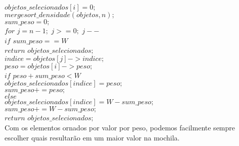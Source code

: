 \documentclass[10pt,a4paper]{article}
\begin{document}
	\hspace{2cm}$objetos\_selecionados[i] = 0;$\\

	\hspace{1cm}$mergesort\_densidade(objetos,n);$\\

	\hspace{1cm}$sum\_peso=0;$\\

	\hspace{1cm}$for$ $j=n-1;$ $j>=0;$ $j--$\\

	\hspace{2cm}$if$ $sum\_peso == W$\\
	
	\hspace{3cm}$return$ $objetos\_selecionados;$\\
	
	\hspace{2cm}$indice = objetos[j]->indice;$\\
	
	\hspace{2cm}$peso =  objetos[i]->peso;$\\

	\hspace{2cm}$if$ $peso + sum\_peso < W$\\
	
	\hspace{3cm}$objetos\_selecionados[indice] = peso;$\\
	
	\hspace{3cm}$sum\_peso+=peso;$\\
	
	\hspace{2cm}$else$\\
	
	\hspace{3cm}$objetos\_selecionados[indice] = W-sum\_peso;$\\
	
	\hspace{3cm}$sum\_peso+=W-sum\_peso;$\\
	
	\hspace{1cm}$return$ $objetos\_selecionados;$\\
	
	
	Com os elementos ornados por valor por peso, podemos facilmente sempre escolher quais resultarão em um maior valor na mochila.\\
	
\end{document}
